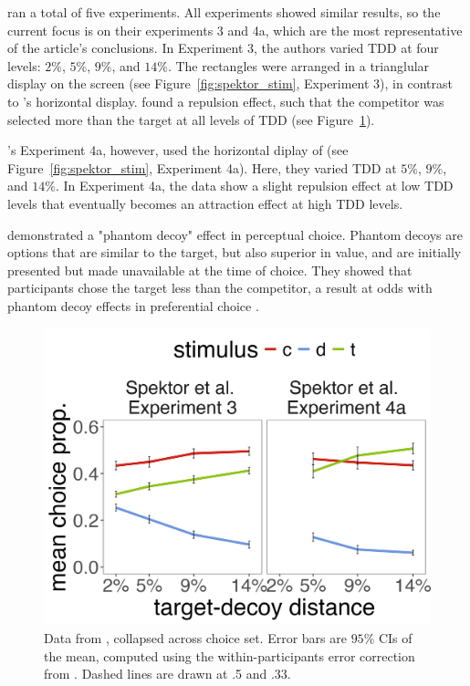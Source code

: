 \textcite{spektorWhenGoodLooks2018b} ran a total of five experiments. All experiments showed similar results, so the current focus is on their experiments 3 and 4a, which are the most representative of the article's conclusions. In Experiment 3, the authors varied TDD at four levels: $2\%$, $5\%$, $9\%$, and $14\%$. The rectangles were arranged in a trianglular display on the screen (see Figure~\ref{fig:spektor_stim}, Experiment 3), in contrast to \textcite{trueblood2013not}'s horizontal display. \textcite{spektorWhenGoodLooks2018b} found a repulsion effect, such that the competitor was selected more than the target at all levels of TDD (see Figure~\ref{fig:spektor_data}). 

\textcite{spektorWhenGoodLooks2018b}'s Experiment 4a, however, used the horizontal diplay of \textcite{trueblood2013not} (see Figure~\ref{fig:spektor_stim}, Experiment 4a). Here, they varied TDD at $5\%$, $9\%$, and $14\%$. In Experiment 4a, the data show a slight repulsion effect at low TDD levels that eventually becomes an attraction effect at high TDD levels. 

\textcite{truebloodPhantomDecoyEffect2017c} demonstrated a "phantom decoy" effect in perceptual choice. Phantom decoys are options that are similar to the target, but also superior in value, and are initially presented but made unavailable at the time of choice. They showed that participants chose the target less than the competitor, a result at odds with phantom decoy effects in preferential choice \parencite{pratkanisBriefHistoryResearch1992b,pettiboneExaminingModelsNondominated2000}. 

\begin{figure}
   \includegraphics[width=\linewidth]{figures/spektor_data_collapsed.jpeg}
   \caption{Data from \textcite{spektorWhenGoodLooks2018b}, collapsed across choice set. Error bars are $95\%$ CIs of the mean, computed using the within-participants error correction from \textcite{morey2008confidence}. Dashed lines are drawn at .5 and .33.}
   \label{fig:spektor_data} %
\end{figure}

